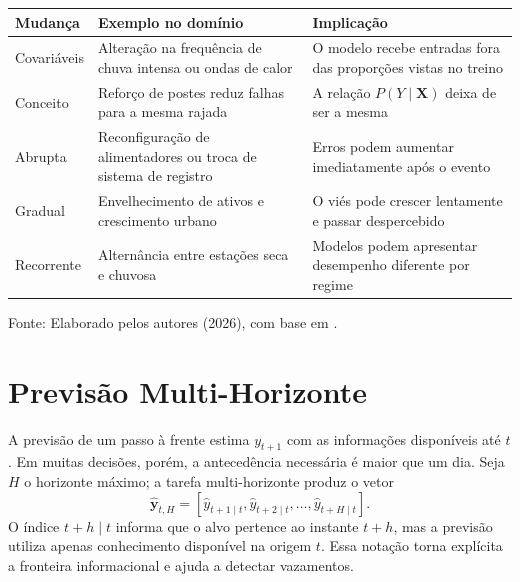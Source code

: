 \begin{quadro}[H]
\caption{Principais formas de mudança temporal no contexto da distribuição elétrica}
\label{qua:tipos_drift}
\centering
\small
\begin{tabular}{p{3.0cm} p{5.2cm} p{5.3cm}}
\toprule
\textbf{Mudança} & \textbf{Exemplo no domínio} & \textbf{Implicação} \\
\midrule
Covariáveis & Alteração na frequência de chuva intensa ou ondas de calor & O modelo recebe entradas fora das proporções vistas no treino \\
Conceito & Reforço de postes reduz falhas para a mesma rajada & A relação $P(Y\mid\mathbf{X})$ deixa de ser a mesma \\
Abrupta & Reconfiguração de alimentadores ou troca de sistema de registro & Erros podem aumentar imediatamente após o evento \\
Gradual & Envelhecimento de ativos e crescimento urbano & O viés pode crescer lentamente e passar despercebido \\
Recorrente & Alternância entre estações seca e chuvosa & Modelos podem apresentar desempenho diferente por regime \\
\bottomrule
\end{tabular}
\normalsize
\par\smallskip
{\small Fonte: Elaborado pelos autores (2026), com base em \cite{kabir2024datastreams, udeh2024probabilistic}.\par}
\end{quadro}

\section{Previsão Multi-Horizonte}\label{sec:fund_multi_horizonte}

A previsão de um passo à frente estima $y_{t+1}$ com as informações disponíveis até $t$. Em muitas decisões, porém, a antecedência necessária é maior que um dia. Seja $H$ o horizonte máximo; a tarefa multi-horizonte produz o vetor
\begin{equation}
    \widehat{\mathbf{y}}_{t,H}
    =\left[\hat{y}_{t+1\mid t},\hat{y}_{t+2\mid t},\ldots,
    \hat{y}_{t+H\mid t}\right].
    \label{eq:vetor_multihorizonte}
\end{equation}
O índice $t+h\mid t$ informa que o alvo pertence ao instante $t+h$, mas a previsão utiliza apenas conhecimento disponível na origem $t$. Essa notação torna explícita a fronteira informacional e ajuda a detectar vazamentos.

